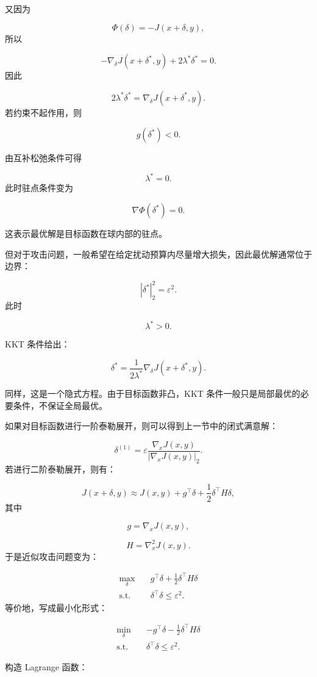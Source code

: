 ﻿\documentclass[UTF8,zihao=-4,fontset=none]{ctexart}
\begin{document}
又因为

\[
\Phi(\delta)=-J(x+\delta,y),
\]
\noindent 所以

\[
-\nabla_\delta J(x+\delta^*,y)+2\lambda^*\delta^*=0.
\]
\noindent 因此

\[
2\lambda^*\delta^*
=
\nabla_\delta J(x+\delta^*,y).
\]
\noindent 若约束不起作用，则

\[
g(\delta^*)<0.
\]

由互补松弛条件可得

\[
\lambda^*=0.
\]
\noindent 此时驻点条件变为

\[
\nabla\Phi(\delta^*)=0.
\]

这表示最优解是目标函数在球内部的驻点。

但对于攻击问题，一般希望在给定扰动预算内尽量增大损失，因此最优解通常位于边界：

\[
|\delta^*|_2^2=\varepsilon^2.
\]
\noindent 此时

\[
\lambda^*>0.
\]

KKT 条件给出：

\[
\delta^*
=
\frac{1}{2\lambda^*}
\nabla_\delta J(x+\delta^*,y).
\]

同样，这是一个隐式方程。由于目标函数非凸，KKT 条件一般只是局部最优的必要条件，不保证全局最优。

如果对目标函数进行一阶泰勒展开，则可以得到上一节中的闭式满意解：

\[
\delta^{(1)}
=
\varepsilon
\frac{\nabla_xJ(x,y)}{|\nabla_xJ(x,y)|_2}.
\]
\noindent 若进行二阶泰勒展开，则有：

\[
J(x+\delta,y)
\approx
J(x,y)+g^\top\delta+\frac12\delta^\top H\delta,
\]
\noindent 其中

\[
g=\nabla_xJ(x,y),
\]

\[
H=\nabla_x^2J(x,y).
\]
\noindent 于是近似攻击问题变为：

\[
\begin{aligned}
\max_{\delta}
\quad
&
g^\top\delta+\frac12\delta^\top H\delta\\
\mathrm{s.t.}
\quad
&
\delta^\top\delta\le\varepsilon^2.
\end{aligned}
\]
\noindent 等价地，写成最小化形式：

\[
\begin{aligned}
\min_{\delta}
\quad
&
-g^\top\delta-\frac12\delta^\top H\delta\\
\mathrm{s.t.}
\quad
&
\delta^\top\delta\le\varepsilon^2.
\end{aligned}
\]

构造 Lagrange 函数：
\end{document}
